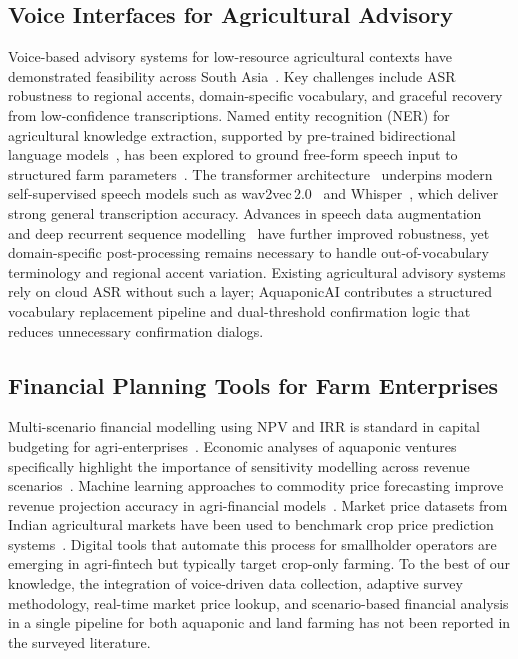 \documentclass[runningheads]{llncs}
\begin{document}
\subsection{Voice Interfaces for Agricultural Advisory}

Voice-based advisory systems for low-resource agricultural contexts
have demonstrated feasibility across South Asia~\cite{ref3,ref20}. Key
challenges include ASR robustness to regional accents, domain-specific
vocabulary, and graceful recovery from low-confidence transcriptions.
Named entity recognition (NER) for agricultural knowledge extraction,
supported by pre-trained bidirectional language models~\cite{ref25},
has been explored to ground free-form speech input to structured farm
parameters~\cite{ref9}. The transformer architecture~\cite{ref29}
underpins modern self-supervised speech models such as
wav2vec\,2.0~\cite{ref10} and Whisper~\cite{ref5}, which deliver
strong general transcription accuracy. Advances in speech data
augmentation~\cite{ref28} and deep recurrent sequence
modelling~\cite{ref26} have further improved robustness, yet
domain-specific post-processing remains necessary to handle
out-of-vocabulary terminology and regional accent variation. Existing agricultural advisory systems rely on cloud
ASR without such a layer; AquaponicAI contributes a structured
vocabulary replacement pipeline and dual-threshold confirmation logic
that reduces unnecessary confirmation dialogs.

\subsection{Financial Planning Tools for Farm Enterprises}

Multi-scenario financial modelling using NPV and IRR is standard
in capital budgeting for agri-enterprises~\cite{ref4,ref33}. Economic
analyses of aquaponic ventures specifically highlight the importance
of sensitivity modelling across revenue scenarios~\cite{ref31}. Machine
learning approaches to commodity price forecasting improve revenue
projection accuracy in agri-financial models~\cite{ref11}. Market
price datasets from Indian agricultural markets have been used to
benchmark crop price prediction systems~\cite{ref17}. Digital tools
that automate this process for smallholder operators are emerging in
agri-fintech but typically target crop-only farming. To the best of
our knowledge, the integration of voice-driven data collection,
adaptive survey methodology, real-time market price lookup, and
scenario-based financial analysis in a single pipeline for both
aquaponic and land farming has not been reported in the surveyed
literature.
\end{document}
